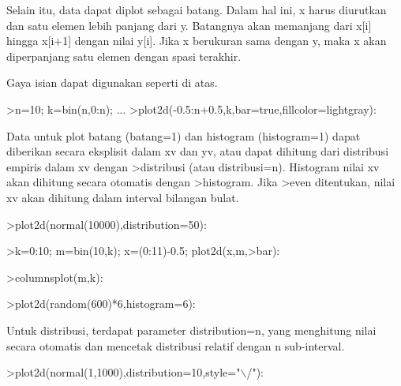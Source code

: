 \documentclass{article}
\begin{document}
\begin{eulernotebook}
\begin{eulercomment}
\begin{eulercomment}
\begin{eulercomment}
\begin{eulercomment}
\begin{eulercomment}
\begin{eulercomment}
\begin{eulercomment}
\begin{eulercomment}
\begin{eulercomment}
\begin{eulercomment}
\begin{eulercomment}
\begin{eulercomment}
\begin{eulercomment}
\begin{eulercomment}
\begin{eulercomment}
Selain itu, data dapat diplot sebagai batang. Dalam hal ini, x harus
diurutkan dan satu elemen lebih panjang dari y. Batangnya akan
memanjang dari x[i] hingga x[i+1] dengan nilai y[i]. Jika x berukuran
sama dengan y, maka x akan diperpanjang satu elemen dengan spasi
terakhir.

Gaya isian dapat digunakan seperti di atas.
\end{eulercomment}
\begin{eulerprompt}
>n=10; k=bin(n,0:n); ...
>plot2d(-0.5:n+0.5,k,bar=true,fillcolor=lightgray):
\end{eulerprompt}
\begin{eulercomment}
Data untuk plot batang (batang=1) dan histogram (histogram=1) dapat
diberikan secara eksplisit dalam xv dan yv, atau dapat dihitung dari
distribusi empiris dalam xv dengan \textgreater{}distribusi (atau distribusi=n).
Histogram nilai xv akan dihitung secara otomatis dengan \textgreater{}histogram.
Jika \textgreater{}even ditentukan, nilai xv akan dihitung dalam interval bilangan
bulat.
\end{eulercomment}
\begin{eulerprompt}
>plot2d(normal(10000),distribution=50):
\end{eulerprompt}
\begin{eulerprompt}
>k=0:10; m=bin(10,k); x=(0:11)-0.5; plot2d(x,m,>bar):
\end{eulerprompt}
\begin{eulerprompt}
>columnsplot(m,k):
\end{eulerprompt}
\begin{eulerprompt}
>plot2d(random(600)*6,histogram=6):
\end{eulerprompt}
\begin{eulercomment}
Untuk distribusi, terdapat parameter distribution=n, yang menghitung
nilai secara otomatis dan mencetak distribusi relatif dengan n
sub-interval.
\end{eulercomment}
\begin{eulerprompt}
>plot2d(normal(1,1000),distribution=10,style="\(\backslash\)/"):
\end{eulerprompt}
\begin{eulercomment}

\end{eulercomment}
\end{eulercomment}
\end{eulercomment}
\end{eulercomment}
\end{eulercomment}
\end{eulercomment}
\end{eulercomment}
\end{eulercomment}
\end{eulercomment}
\end{eulercomment}
\end{eulercomment}
\end{eulercomment}
\end{eulercomment}
\end{eulercomment}
\end{eulercomment}
\end{eulernotebook}
\end{document}
